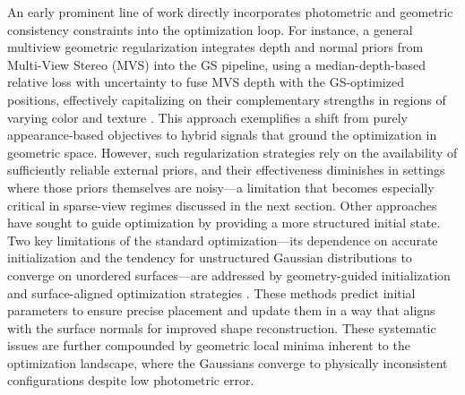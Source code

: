 \documentclass[11pt,a4paper]{article}
\begin{document}
An early prominent line of work directly incorporates photometric and geometric consistency constraints into the optimization loop. For instance, a general multiview geometric regularization integrates depth and normal priors from Multi-View Stereo (MVS) into the GS pipeline, using a median-depth-based relative loss with uncertainty to fuse MVS depth with the GS-optimized positions, effectively capitalizing on their complementary strengths in regions of varying color and texture \cite{arxiv:2506.13508v1}. This approach exemplifies a shift from purely appearance-based objectives to hybrid signals that ground the optimization in geometric space. However, such regularization strategies rely on the availability of sufficiently reliable external priors, and their effectiveness diminishes in settings where those priors themselves are noisy---a limitation that becomes especially critical in sparse-view regimes discussed in the next section. Other approaches have sought to guide optimization by providing a more structured initial state. Two key limitations of the standard optimization---its dependence on accurate initialization and the tendency for unstructured Gaussian distributions to converge on unordered surfaces---are addressed by geometry-guided initialization and surface-aligned optimization strategies \cite{arxiv:2507.00363v1}. These methods predict initial parameters to ensure precise placement and update them in a way that aligns with the surface normals for improved shape reconstruction. These systematic issues are further compounded by geometric local minima inherent to the optimization landscape, where the Gaussians converge to physically inconsistent configurations despite low photometric error.
\end{document}
